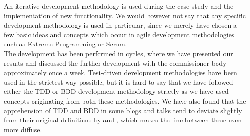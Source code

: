 
An iterative development methodology is used during the case study and
the implementation of new functionality. We would however not say that
any specific development methodology is used in particular, since we
merely have chosen a few basic ideas and concepts which occur in agile
development methodologies such as Extreme Programming or Scrum.\\

The development has been performed in cycles, where we have presented
our results and discussed the further development with the commissioner
body approximately once a week. Test-driven development methodologies
have been used in the strictest way possible, but it is hard to say that
we have followed either the TDD or BDD development methodology strictly
as we have used concepts originating from both these methodologies. We
have also found that the apprehension of TDD and BDD in some blogs and
talks tend to deviate slightly from their original definitions by
\citeauthor{book:tdd_beck} and \citeauthor{web:dan_north}, which makes
the line between these even more diffuse.\\
